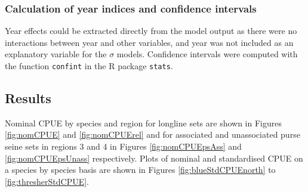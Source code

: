 \subsubsection{Calculation of year indices and confidence intervals}
Year effects could be extracted directly from the model output as there were no interactions between year and other variables, and year was not included as an explanatory variable for the $\sigma$ models. Confidence intervals were computed with the function \texttt{confint} in the R package \texttt{stats}.
\clearpage
\subsection{Results}

Nominal CPUE by species and region for longline sets are shown in Figures \ref{fig:nomCPUE} and \ref{fig:nomCPUErel} and for associated and unassociated purse seine sets in regions 3 and 4 in Figures \ref{fig:nomCPUEpsAss} and \ref{fig:nomCPUEpsUnass} respectively. Plots of nominal and standardised CPUE on a species by species basis are shown in Figures \ref{fig:blueStdCPUEnorth} to \ref{fig:thresherStdCPUE}.
 
